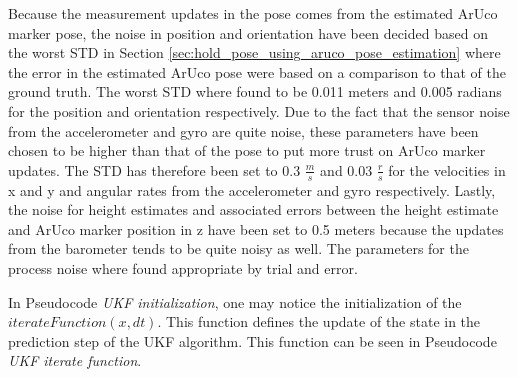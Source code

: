 \documentclass[../Head/report.tex]{subfiles}
\begin{document}
Because the measurement updates in the pose comes from the estimated ArUco marker pose, the noise in position and orientation have been decided based on the worst STD in Section \ref{sec:hold_pose_using_aruco_pose_estimation} where the error in the estimated ArUco pose were based on a comparison to that of the ground truth. The worst STD where found to be 0.011 meters and 0.005 radians for the position and orientation respectively. Due to the fact that the sensor noise from the accelerometer and gyro are quite noise, these parameters have been chosen to be higher than that of the pose to put more trust on ArUco marker updates. The STD has therefore been set to 0.3 $\frac{m}{s}$ and 0.03 $\frac{r}{s}$ for the velocities in x and y and angular rates from the accelerometer and gyro respectively. Lastly, the noise for height estimates and associated errors between the height estimate and ArUco marker position in z have been set to 0.5 meters because the updates from the barometer tends to be quite noisy as well. The parameters for the process noise where found appropriate by trial and error.

In Pseudocode \textit{UKF initialization}, one may notice the initialization of the $iterateFunction(x,dt)$. This function defines the update of the state in the prediction step of the UKF algorithm. This function can be seen in Pseudocode \textit{UKF iterate function}.           
\end{document}
